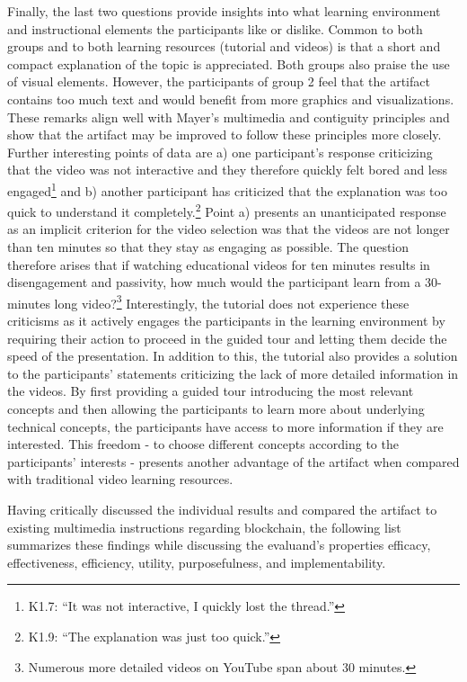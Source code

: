 Finally, the last two questions provide insights into what learning environment and instructional elements the participants like or dislike. Common to both groups and to both learning resources (tutorial and videos) is that a short and compact explanation of the topic is appreciated. Both groups also praise the use of visual elements. However, the participants of group 2 feel that the artifact contains too much text and would benefit from more graphics and visualizations. These remarks align well with Mayer's multimedia and contiguity principles and show that the artifact may be improved to follow these principles more closely. Further interesting points of data are a) one participant's response criticizing that the video was not interactive and they therefore quickly felt bored and less engaged\footnote{K1.7: \enquote{It was not interactive, I quickly lost the thread.}} and b) another participant has criticized that the explanation was too quick to understand it completely.\footnote{K1.9: \enquote{The explanation was just too quick.} } Point a) presents an unanticipated response as an implicit criterion for the video selection was that the videos are not longer than ten minutes so that they stay as engaging as possible. The question therefore arises that if watching educational videos for ten minutes results in disengagement and passivity, how much would the participant learn from a 30-minutes long video?\footnote{Numerous more detailed videos on YouTube span about 30 minutes.} Interestingly, the tutorial does not experience these criticisms as it actively engages the participants in the learning environment by requiring their action to proceed in the guided tour and letting them decide the speed of the presentation. In addition to this, the tutorial also provides a solution to the participants' statements criticizing the lack of more detailed information in the videos. By first providing a guided tour introducing the most relevant concepts and then allowing the participants to learn more about underlying technical concepts, the participants have access to more information if they are interested. This freedom - to choose different concepts according to the participants' interests - presents another advantage of the artifact when compared with traditional video learning resources.

Having critically discussed the individual results and compared the artifact to existing multimedia instructions regarding blockchain, the following list summarizes these findings while discussing the evaluand's properties efficacy, effectiveness, efficiency, utility, purposefulness, and implementability.

